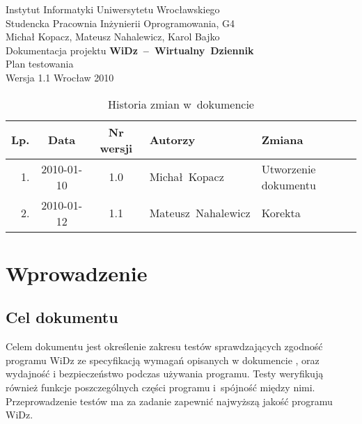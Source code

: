 \documentclass[12pt,leqno,twoside]{mwart}
\begin{document}
\begin{titlepage}
\begin{center}
Instytut Informatyki Uniwersytetu Wrocławskiego \\
Studencka Pracownia Inżynierii Oprogramowania, G4 \\
\vspace{4cm}
\Large Michał Kopacz, Mateusz Nahalewicz, Karol Bajko \\
\vspace{0.5cm}
\huge Dokumentacja projektu \mbox{\textbf{WiDz -- Wirtualny Dziennik}} \\ \Large Plan testowania\\
\vspace{1cm}
\normalsize Wersja 1.1
\vfill
\normalsize Wrocław 2010
\end{center}
\end{titlepage}

\newpage

\begin{table}
	\centering
	\caption{Historia zmian w~dokumencie}
		\begin{tabular}{|r|c|c|l|l|}
		\hline
		Lp. 	& Data       & Nr wersji 	& Autorzy           		& Zmiana \\ \hline
		1.   	& 2010-01-10 & 1.0       	& \mbox{Michał Kopacz} & Utworzenie dokumentu \\ \hline
		2.   	& 2010-01-12 & 1.1       	& \mbox{Mateusz Nahalewicz} & Korekta \\ \hline
		\end{tabular}
\end{table}

\newpage

\tableofcontents

\newpage

\section{Wprowadzenie}
\subsection{Cel dokumentu}
\noindent Celem dokumentu jest określenie zakresu testów sprawdzających zgodność programu WiDz ze specyfikacją wymagań opisanych w dokumencie \cite{WYM}, oraz wydajność i bezpieczeństwo podczas używania programu. Testy weryfikują również funkcje poszczególnych części programu i~spójność między nimi. Przeprowadzenie testów ma za zadanie zapewnić najwyższą jakość programu WiDz. \\
\end{document}
